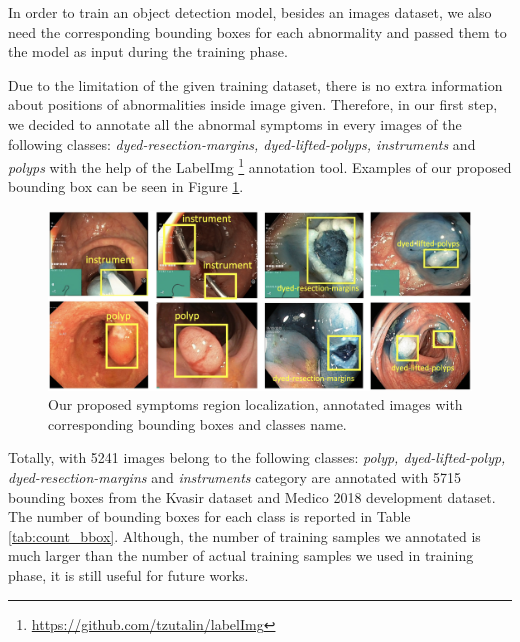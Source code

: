 In order to train an object detection model, besides an images dataset, we also need the corresponding bounding boxes for each abnormality and passed them to the model as input during the training phase. 

Due to the limitation of the given training dataset, there is no extra information about positions of abnormalities inside image  given. Therefore, in our first step, we decided to annotate all the abnormal symptoms in every images of the following classes: \textit{dyed-resection-margins, dyed-lifted-polyps, instruments} and \textit{polyps} with the help of the LabelImg \footnote{\url{https://github.com/tzutalin/labelImg}} annotation tool. Examples of our proposed bounding box can be seen in Figure \ref{fig:symptoms_localization}.

\begin{figure}[thb]
\begin{center}
\includegraphics[width=\textwidth]{endoscopy_resources/symptoms_region_localization.png}
\end{center}
   \caption{Our proposed symptoms region localization, annotated images with corresponding bounding boxes and classes name.}
\label{fig:symptoms_localization}
\end{figure}

Totally, with 5241 images belong to the following classes: \textit{polyp, dyed-lifted-polyp, dyed-resection-margins} and \textit{instruments} category are annotated with 5715 bounding boxes from the Kvasir dataset \cite{Pogorelov:2017:KMI:3083187.3083212} and Medico 2018 development dataset. The number of bounding boxes for each class is reported in Table \ref{tab:count_bbox}. Although, the number of training samples we annotated is much larger than the number of actual training samples we used in training phase, it is still useful for future works. 

